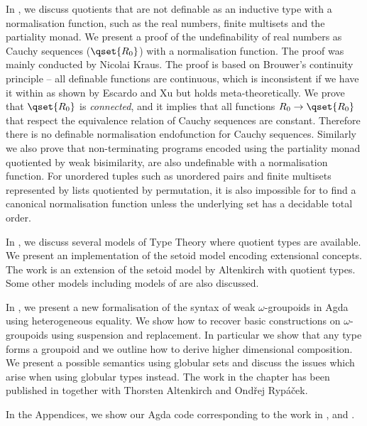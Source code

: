 In , we discuss quotients that are not definable as an
inductive type with a normalisation function, such as the real
numbers, finite multisets and the partiality monad. We present a proof
of the undefinability of real numbers as Cauchy sequences
($\qset{R_0}$) with a normalisation function. The proof was mainly
conducted by Nicolai Kraus. The proof is based on Brouwer's continuity
principle -- all definable functions are continuous, which is
inconsistent if we have it within \mltt as shown by Escardo and Xu
\cite{incon} but holds meta-theoretically. We prove that $\qset{R_0}$
is \emph{connected}, and it implies that all functions $R_0 \to
\qset{R_0}$ that respect the equivalence relation of Cauchy sequences
are constant. Therefore there is no definable normalisation
endofunction for Cauchy sequences. Similarly we also prove that
non-terminating programs encoded using the partiality monad quotiented
by weak bisimilarity, are also undefinable with a normalisation
function. For unordered tuples such as unordered pairs and finite
multisets represented by lists quotiented by permutation, it is also
impossible for to find a canonical normalisation function unless the
underlying set has a decidable total order.


In , we discuss several models of Type Theory where
quotient types are available. We present an implementation of the
setoid model encoding extensional concepts. The work is an extension
of the setoid model by Altenkirch \cite{alti:lics99} with quotient
types. Some other models including models of \hott are also discussed.


In , we present a new formalisation of the syntax of weak
$\omega$-groupoids in Agda using heterogeneous equality. We show how
to recover basic constructions on $\omega$-groupoids using suspension
and replacement. In particular we show that any type forms a groupoid
and we outline how to derive higher dimensional composition. We
present a possible semantics using globular sets and discuss the
issues which arise when using globular types instead. The work in the
chapter has been published in \cite{LFMTP14} together with Thorsten
Altenkirch and Ond\v{r}ej Ryp\'{a}\v{c}ek.


In the Appendices, we show our Agda code corresponding to the work in
,  and .
